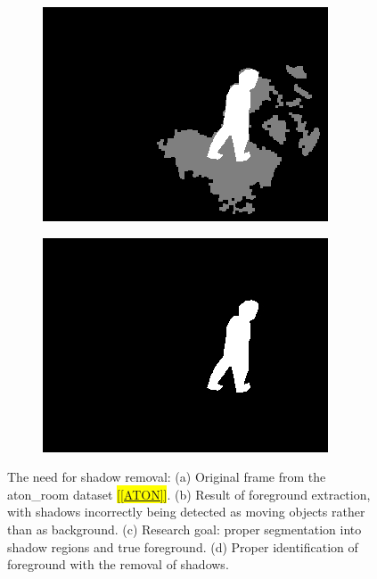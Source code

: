\begin{figure}
\begin{subfigure}{.49\linewidth}
    \includegraphics[width=1\linewidth]{figures/background/room_0295_shadows.jpg}
    \caption{}
  \end{subfigure}
  \hfill
  \begin{subfigure}{.49\linewidth}
  \centering
    \includegraphics[width=1\linewidth]{figures/background/room_0295_clean.jpg}
    \caption{}
  \end{subfigure}
  \caption{The need for shadow removal: (a) Original frame from the aton\_room dataset \hl{[\ref{ATON}]}. (b) Result of foreground extraction, with shadows incorrectly being detected as moving objects rather than as background. (c) Research goal: proper segmentation into shadow regions and true foreground. (d) Proper identification of foreground with the removal of shadows.}
\label{fig:nonshadow}
\end{figure}

